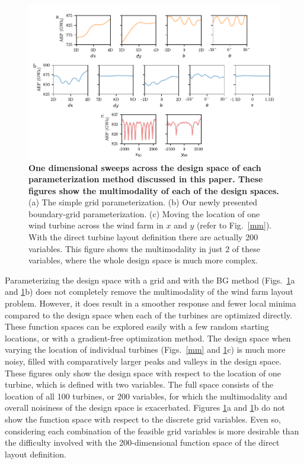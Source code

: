 \documentclass[wes, manuscript]{copernicus}
\begin{document}
\begin{figure}
\centering
\includegraphics{paper-figures/multimodality.pdf}
\caption{ \textbf{One dimensional sweeps across the design space of each parameterization method discussed in this paper. These figures show the multimodality of each of the design spaces.} (a) The simple grid parameterization. (b) Our newly presented boundary-grid parameterization. (c) Moving the location of one wind turbine across the wind farm in $x$ and $y$ (refer to Fig.~\ref{mm}). With the direct turbine layout definition there are actually 200 variables. This figure shows the multimodality in just 2 of these variables, where the whole design space is much more complex.}
\label{multimodality}
\end{figure}

Parameterizing the design space with a grid and with the BG method (Figs.~\ref{multimodality}a and \ref{multimodality}b) does not completely remove the multimodality of the wind farm layout problem. However, it does result in a smoother response and fewer local minima compared to the design space when each of the turbines are optimized directly. These function spaces can be explored easily with a few random starting locations, or with a gradient-free optimization method. 
The design space when varying the location of individual turbines (Figs.~\ref{mm} and \ref{multimodality}c) is much more noisy, filled with comparatively larger peaks and valleys in the design space. These figures only show the design space with respect to the location of one turbine, which is defined with two variables. The full space consists of the location of all 100 turbines, or 200 variables, for which the multimodality and overall noisiness of the design space is exacerbated.
%
Figures \ref{multimodality}a and \ref{multimodality}b do not show the function space with respect to the discrete grid variables. Even so, considering each combination of the feasible grid variables is more desirable than the difficulty involved with the 200-dimensional function space of the direct layout definition.
\end{document}
